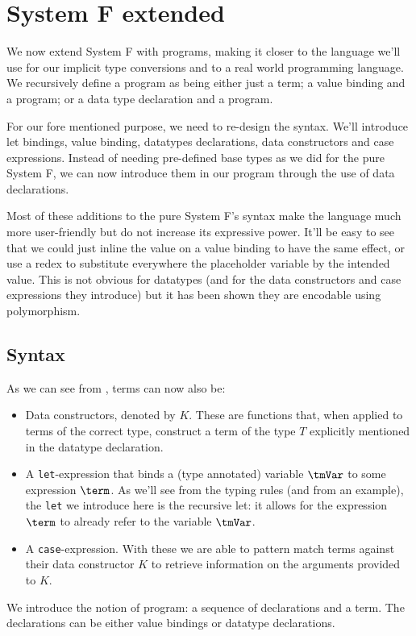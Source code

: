 
\section{System F extended}
We now extend System F with programs, making it closer to the language we'll use for our implicit type conversions and to a real world programming language. We recursively define a program as being either just a term; a value binding and a program; or a data type declaration and a program.

For our fore mentioned purpose, we need to re-design the syntax. We'll introduce let bindings, value binding, datatypes declarations, data constructors and case expressions. Instead of needing pre-defined base types as we did for the pure System F, we can now introduce them in our program through the use of data declarations.

Most of these additions to the pure System F's syntax make the language much more user-friendly but do not increase its expressive power. It'll be easy to see that we could just inline the value on a value binding to have the same effect, or use a redex to substitute everywhere the placeholder variable by the intended value. This is not obvious for datatypes (and for the data constructors and case expressions they introduce) but it has been shown they are encodable using polymorphism.

\subsection{Syntax}
As we can see from , terms can now also be:
\begin{itemize}
\item Data constructors, denoted by $K$. These are functions that, when applied to terms of the correct type, construct a term of the type $T$ explicitly mentioned in the datatype declaration.
\item A \texttt{let}-expression that binds a (type annotated) variable $\tmVar$ to some expression $\term$. As we'll see from the typing rules (and from an example), the \texttt{let} we introduce here is the recursive let: it allows for the expression $\term$ to already refer to the variable $\tmVar$.
\item A \texttt{case}-expression. With these we are able to pattern match terms against their data constructor $K$ to retrieve information on the arguments provided to $K$.
\end{itemize}
We introduce the notion of program: a sequence of declarations and a term. The declarations can be either value bindings or datatype declarations.

